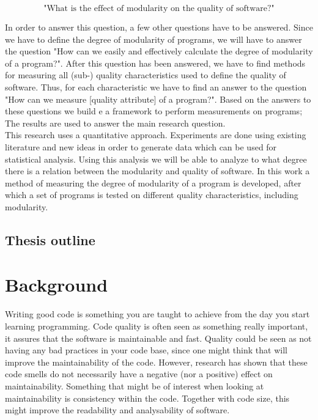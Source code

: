 \documentclass[twoside]{uva-inf-bachelor-thesis}
\begin{document}
\[ \text{"What is the effect of modularity on the quality of software?"} \]

In order to answer this question, a few other questions have to be answered. Since we have to define the degree of modularity of programs, we will have to answer the question "How can we easily and effectively calculate the degree of modularity of a program?". After this question has been answered, we have to find methods for measuring all (sub-) quality characteristics used to define the quality of software. Thus, for each characteristic we have to find an answer to the question "How can we measure [quality attribute] of a program?". Based on the answers to these questions we build e a framework to perform measurements on programs; The results are used to answer the main research question.\\

This research uses a quantitative approach. Experiments are done using existing literature and new ideas in order to generate data which can be used for statistical analysis. Using this analysis we will be able to analyze to what degree there is a relation between the modularity and quality of software. In this work a method of measuring the degree of modularity of a program is developed, after which a set of programs is tested on different quality characteristics, including modularity.

\section{Thesis outline}

\chapter{Background}
Writing good code is something you are taught to achieve from the day you start learning programming. Code quality is often seen as something really important, it assures that the software is maintainable and fast. Quality could be seen as not having any bad practices in your code base, since one might think that will improve the maintainability of the code. However, research has shown that these code smells do not necessarily have a negative (nor a positive) effect on maintainability\cite{sjoberg2013quantifying}. Something that might be of interest when looking at maintainability is consistency within the code. Together with code size, this might improve the readability and analysability of software.
\end{document}
